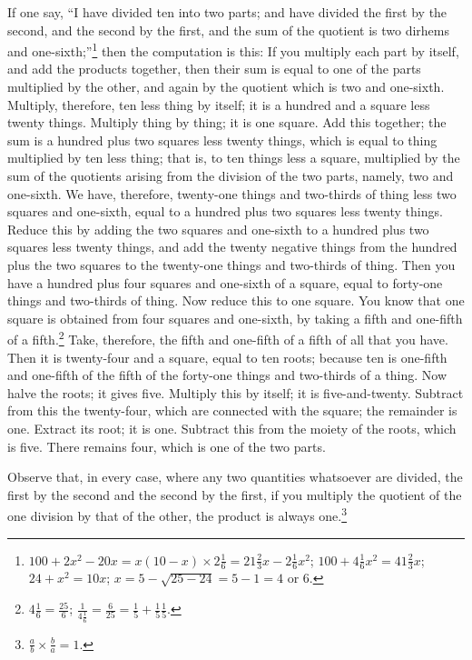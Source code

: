 If one say, ``I have divided ten into two parts; and have divided the first by the second, and the second by the first, and the sum of the quotient is two dirhems and one-sixth;''\footnote{$100 + 2x^2 - 20x = x(10-x) \times 2\frac{1}{6} = 21\frac{2}{3}x - 2\frac{1}{6}x^2$; $100 + 4\frac{1}{6}x^2 = 41\frac{2}{3}x$; $24 + x^2 = 10x$; $x = 5 - \sqrt{25-24} = 5 - 1 = 4$ or $6$.} then the computation is this: If you multiply each part by itself, and add the products together, then their sum is equal to one of the parts multiplied by the other, and again by the quotient which is two and one-sixth. Multiply, therefore, ten less thing by itself; it is a hundred and a square less twenty things. Multiply thing by thing; it is one square. Add this together; the sum is a hundred plus two squares less twenty things, which is equal to thing multiplied by ten less thing; that is, to ten things less a square, multiplied by the sum of the quotients arising from the division of the two parts, namely, two and one-sixth. We have, therefore, twenty-one things and two-thirds of thing less two squares and one-sixth, equal to a hundred plus two squares less twenty things. Reduce this by adding the two squares and one-sixth to a hundred plus two squares less twenty things, and add the twenty negative things from the hundred plus the two squares to the twenty-one things and two-thirds of thing. Then you have a hundred plus four squares and one-sixth of a square, equal to forty-one things and two-thirds of thing. Now reduce this to one square. You know that one square is obtained from four squares and one-sixth, by taking a fifth and one-fifth of a fifth.\footnote{$4\frac{1}{6} = \frac{25}{6}$; $\frac{1}{4\frac{1}{6}} = \frac{6}{25} = \frac{1}{5} + \frac{1}{5}\frac{1}{5}$.} Take, therefore, the fifth and one-fifth of a fifth of all that you have. Then it is twenty-four and a square, equal to ten roots; because ten is one-fifth and one-fifth of the fifth of the forty-one things and two-thirds of a thing. Now halve the roots; it gives five. Multiply this by itself; it is five-and-twenty. Subtract from this the twenty-four, which are connected with the square; the remainder is one. Extract its root; it is one. Subtract this from the moiety of the roots, which is five. There remains four, which is one of the two parts.

Observe that, in every case, where any two quantities whatsoever are divided, the first by the second and the second by the first, if you multiply the quotient of the one division by that of the other, the product is always one.\footnote{$\frac{a}{b} \times \frac{b}{a} = 1$.}


